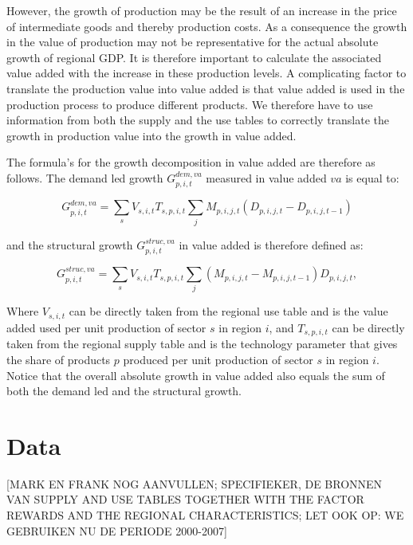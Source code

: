 \documentclass[11pt,parskip,abstracton,notitlepage, paper=a4]{scrartcl}
\begin{document}
However, the growth of production may be the result of an increase in the price of intermediate goods and thereby production costs. As a consequence the growth in the value of production may not be representative for the actual absolute growth of regional GDP. It is therefore important to calculate the associated value added with the increase in these production levels. A complicating factor to translate the production value into value added is that value added is used in the production process to produce different products. We therefore have to use information from both the supply and the use tables to correctly translate the growth in production value into the growth in value added.

The formula's for the growth decomposition in value added are therefore as follows. The demand led growth $G_{p,i,t}^{dem,va}$ measured in value added $va$ is equal to:

\begin{equation}
G_{p,i,t}^{dem,va} = \sum_s V_{s,i,t}T_{s,p,i,t}{\sum_j {M_{p,i,j,t} \left(D_{p,i,j,t} - D_{p,i,j,t-1} \right) }}
\label{eq:Gdemva}
\end{equation}

and the structural growth $G_{p,i,t}^{struc,va}$ in value added is therefore defined as:

\begin{equation}
G_{p,i,t}^{struc,va} = \sum_s V_{s,i,t}T_{s,p,i,t}{\sum_j {\left(M_{p,i,j,t} - M_{p,i,j,t-1} \right)D_{p,i,j,t} }},
\label{eq:strucva}
\end{equation}

Where $V_{s,i,t}$ can be directly taken from the regional use table and is the value added used per unit production of sector $s$ in region $i$, and $T_{s,p,i,t}$ can be directly taken from the regional supply table and is the technology parameter that gives the share of products $p$ produced per unit production of sector $s$ in region $i$. Notice that the overall absolute growth in value added also equals the sum of both the demand led and the structural growth.

\section{Data\label{sec:data}}

[MARK EN FRANK NOG AANVULLEN; SPECIFIEKER, DE BRONNEN VAN SUPPLY AND USE TABLES TOGETHER WITH THE FACTOR REWARDS AND THE REGIONAL CHARACTERISTICS; LET OOK OP: WE GEBRUIKEN NU DE PERIODE 2000-2007]
\end{document}
